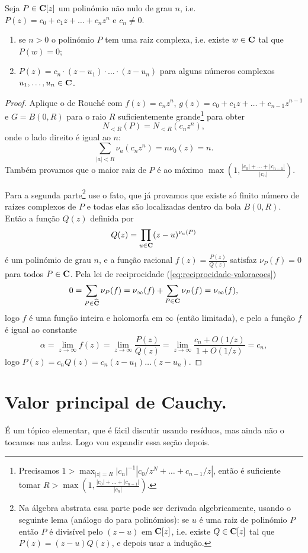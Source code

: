 \begin{cor}
\label{teorema-fundamental-algebra}
Seja $P\in\mathbf{C}[z]$ um polinómio não nulo de grau $n$, i.e.
$P(z) = c_0 + c_1 z + \dots + c_n z^n$ e $c_n\neq 0$.
\begin{enumerate}
\item \label{tfa-1} se $n>0$ o polinómio $P$ tem uma raiz complexa,
i.e. existe $w\in\mathbf{C}$ tal que $P(w) = 0$;
\item \label{tfa-2} $P(z) = c_n \cdot (z-u_1) \cdot \dots \cdot (z-u_n)$
para alguns números complexos $u_1,\dots,u_n\in\mathbf{C}$.
\end{enumerate}
\end{cor}
\begin{proof}
Aplique o  de Rouché com $f(z) = c_n z^n$,
$g(z) = c_0 + c_1 z + \dots + c_{n-1} z^{n-1}$ e $G = B(0,R)$
para o raio $R$ suficientemente grande\footnote{Precisamos
$1 > \max_{|z|=R} |c_n|^{-1} |c_0/z^N + \dots + c_{n-1}/z|$,
então é suficiente tomar $R>\max(1,\frac{|c_0|+\dots+|c_{n-1}|}{|c_n|})$.}
para obter
\[ N_{<R}(P) = N_{<R}(c_n z^n), \]
onde o lado direito é igual ao $n$:
\[ \sum_{|a|<R} \nu_a(c_n z^n) = n \nu_0(z) = n. \]
Também provamos que o maior raiz de $P$ é ao máximo $\max(1,\frac{|c_0|+\dots+|c_{n-1}|}{|c_n|})$.

Para a segunda parte\footnote{Na álgebra abstrata essa parte pode ser derivada algebricamente,
usando o seguinte lema (análogo do  para polinómios):
se $u$ é uma raiz de polinómio $P$ então $P$ é divisível pelo $(z-u)$ em $\mathbf{C}[z]$,
i.e. existe $Q\in\mathbf{C}[z]$ tal que $P(z) = (z-u) Q(z)$, e depois usar a indução.}
use o fato, que já provamos que existe só finito número de raízes complexos de $P$
e todas elas são localizadas dentro da bola $B(0,R)$. Então a função $Q(z)$ definida por
\[ Q(z) = \prod_{u\in\mathbf{C}} (z-u)^{\nu_u(P)} \]
é um polinómio de grau $n$, e a função racional $f(z) = \frac{P(z)}{Q(z)}$
satisfaz $\nu_P(f) = 0$ para todos $P\in\mathbf{C}$.
Pela lei de reciprocidade (\cref{eq:reciprocidade-valoracoes})
\[ 0 = \sum_{P\in\widehat{\mathbf{C}}} \nu_P(f) = \nu_\infty(f) + \sum_{P\in\mathbf{C}} \nu_P(f) = \nu_\infty(f), \]
logo $f$ é uma função inteira e holomorfa em $\infty$ (então limitada),
e pelo  a função $f$ é igual ao constante
\[ \alpha = \lim_{z\to\infty} f(z) = \lim_{z\to\infty} \frac{P(z)}{Q(z)} = \lim_{z\to\infty} \frac{c_n + O(1/z)}{1+O(1/z)} = c_n, \]
logo $P(z) = c_n Q(z) = c_n (z-u_1) \dots (z-u_n)$.
\end{proof}

\section{Valor principal de Cauchy.}
É um tópico elementar, que é fácil discutir usando resíduos,
mas ainda não o tocamos nas aulas. Logo vou expandir essa seção depois.

